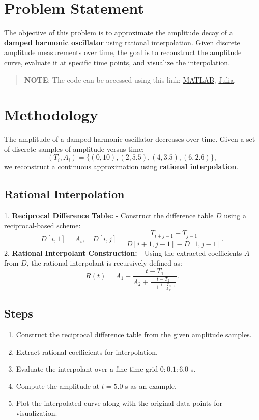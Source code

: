 \section*{Problem Statement}
The objective of this problem is to approximate the amplitude decay of a \textbf{damped harmonic oscillator} using rational interpolation. Given discrete amplitude measurements over time, the goal is to reconstruct the amplitude curve, evaluate it at specific time points, and visualize the interpolation.

\begin{quote}
  \textbf{NOTE}: The code can be accessed using this link: \href{https://raw.githubusercontent.com/HavokSahil/computational-techniques-assignments/refs/heads/main/assignment5/a2.m}{MATLAB}, \href{https://raw.githubusercontent.com/HavokSahil/computational-techniques-assignments/refs/heads/main/assignment5/a2.jl}{Julia}.
\end{quote}

\section*{Methodology}
The amplitude of a damped harmonic oscillator decreases over time. Given a set of discrete samples of amplitude versus time:
\[
(T_i, A_i) = \{(0, 10), (2, 5.5), (4, 3.5), (6, 2.6)\},
\]
we reconstruct a continuous approximation using \textbf{rational interpolation}.

\subsection*{Rational Interpolation}
1. \textbf{Reciprocal Difference Table:}
   - Construct the difference table \(D\) using a reciprocal-based scheme:
   \[
   D[i,1] = A_i, \quad D[i,j] = \frac{T_{i+j-1} - T_{j-1}}{D[i+1,j-1] - D[1,j-1]}.
   \]
2. \textbf{Rational Interpolant Construction:}
   - Using the extracted coefficients \(A\) from \(D\), the rational interpolant is recursively defined as:
   \[
   R(t) = A_1 + \frac{t - T_1}{A_2 + \frac{t - T_2}{\dots + \frac{t - T_{N-1}}{A_N}}}.
   \]

\subsection*{Steps}
\begin{enumerate}
    \item Construct the reciprocal difference table from the given amplitude samples.
    \item Extract rational coefficients for interpolation.
    \item Evaluate the interpolant over a fine time grid \(0:0.1:6.0\) s.
    \item Compute the amplitude at \(t = 5.0\) s as an example.
    \item Plot the interpolated curve along with the original data points for visualization.
\end{enumerate}


